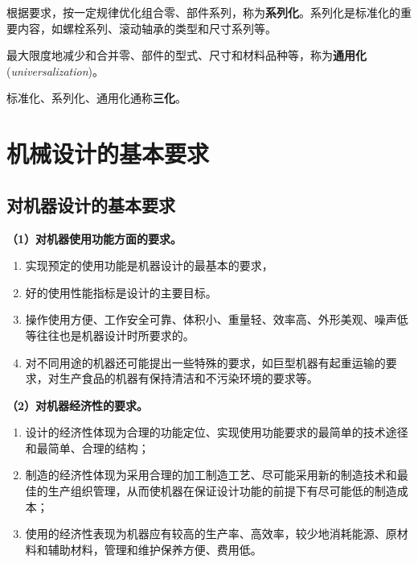 \begin{definition}[系列化]
\label{def:系列化}
根据要求，按一定规律优化组合零、部件系列，称为\textbf{系列化}。系列化是标准化的重要内容，如螺栓系列、滚动轴承的类型和尺寸系列等。
\end{definition}

\begin{definition}[通用化]
\label{def:通用化}
最大限度地减少和合并零、部件的型式、尺寸和材料品种等，称为\textbf{通用化}(\emph{universalization})。
\end{definition}

\begin{keybox}[三化]
标准化、系列化、通用化通称\textbf{三化}。
\end{keybox}

\section{机械设计的基本要求}
\label{sec:机械设计的基本要求}

\subsection{对机器设计的基本要求}

\textbf{（1）对机器使用功能方面的要求。}

\begin{enumerate}
	\item 实现预定的使用功能是机器设计的最基本的要求，
	\item 好的使用性能指标是设计的主要目标。
	\item 操作使用方便、工作安全可靠、体积小、重量轻、效率高、外形美观、噪声低等往往也是机器设计时所要求的。
	\item 对不同用途的机器还可能提出一些特殊的要求，如巨型机器有起重运输的要求，对生产食品的机器有保持清洁和不污染环境的要求等。
\end{enumerate}

\textbf{（2）对机器经济性的要求。}

\begin{enumerate}
	\item 设计的经济性体现为合理的功能定位、实现使用功能要求的最简单的技术途径和最简单、合理的结构；
	\item 制造的经济性体现为采用合理的加工制造工艺、尽可能采用新的制造技术和最佳的生产组织管理，从而使机器在保证设计功能的前提下有尽可能低的制造成本；
	\item 使用的经济性表现为机器应有较高的生产率、高效率，较少地消耗能源、原材料和辅助材料，管理和维护保养方便、费用低。
\end{enumerate}

